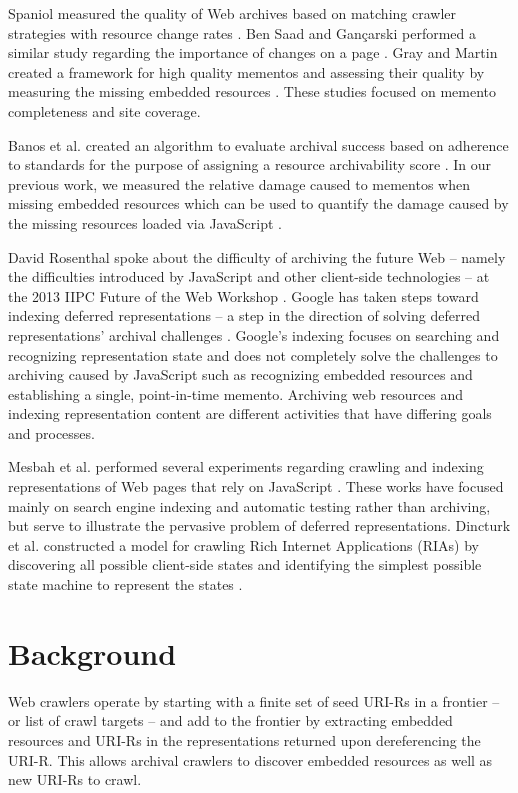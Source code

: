 \documentclass{sig-alternate}
\begin{document}
Spaniol measured the quality of Web archives based on matching crawler strategies with resource change rates \cite{spaniol9catch, spaniol2009data, Denev:2009:SFQ:1687627.1687694}. Ben Saad and Gan\c{c}arski performed a similar study regarding the importance of changes on a page \cite{saad2011}. Gray and Martin created a framework for high quality mementos and assessing their quality by measuring the missing embedded resources \cite{mementoQuality}. These studies focused on memento completeness and site coverage.

Banos et al. created an algorithm to evaluate archival success based on adherence to standards for the purpose of assigning a resource archivability score \cite{ipresArchivability}. In our previous work, we measured the relative damage caused to mementos when missing embedded resources which can be used to quantify the damage caused by the missing resources loaded via JavaScript \cite{brunelleDamage}.

David Rosenthal \cite{iipc2013} spoke about the difficulty of archiving the future Web -- namely the difficulties introduced by JavaScript and other client-side technologies -- at the 2013 IIPC Future of the Web Workshop \cite{futureWeb}. Google has taken steps toward indexing deferred representations -- a step in the direction of solving deferred representations' archival challenges \cite{googleJS}. Google's indexing focuses on searching and recognizing representation state and does not completely solve the challenges to archiving caused by JavaScript such as recognizing embedded resources and establishing a single, point-in-time memento. Archiving web resources and indexing representation content are different activities that have differing goals and processes.

Mesbah et al. performed several experiments regarding crawling and indexing representations of Web pages that rely on JavaScript \cite{mesbahCrawling, mesbahInferState}. These works have focused mainly on search engine indexing and automatic testing \cite{mesbahTesting, mesbah2} rather than archiving, but serve to illustrate the pervasive problem of deferred representations. Dincturk et al. constructed a model for crawling Rich Internet Applications (RIAs) by discovering all possible client-side states and identifying the simplest possible state machine to represent the states \cite{dincturkAjax}. 

\section{Background}
\label{backgroung}
Web crawlers operate by starting with a finite set of seed URI-Rs in a frontier -- or list of crawl targets -- and add to the frontier by extracting embedded resources and URI-Rs in the representations returned upon dereferencing the URI-R. This allows archival crawlers to discover embedded resources as well as new URI-Rs to crawl.
\end{document}
